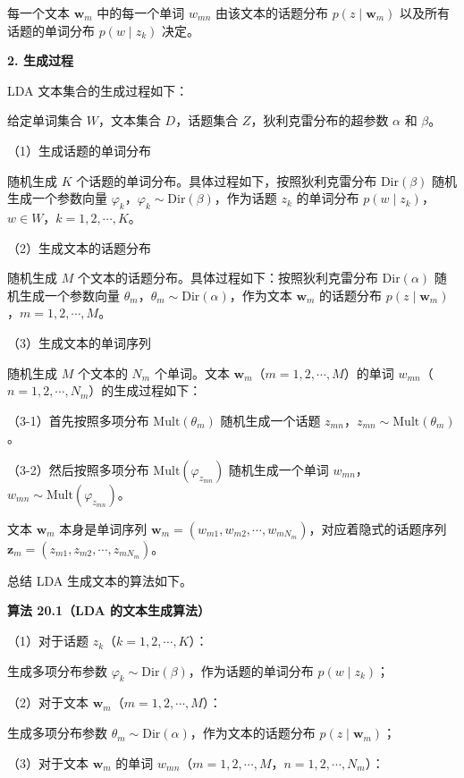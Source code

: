 \documentclass[UTF8,12pt,a4paper,fontset=fandol]{ctexart}
\begin{document}
每一个文本 $\mathbf{w}_m$ 中的每一个单词 $w_{mn}$ 由该文本的话题分布 $p(z\mid \mathbf{w}_m)$ 以及所有话题的单词分布 $p(w\mid z_k)$ 决定。

\noindent\textbf{2. 生成过程}

LDA 文本集合的生成过程如下：

给定单词集合 $W$，文本集合 $D$，话题集合 $Z$，狄利克雷分布的超参数 $\alpha$ 和 $\beta$。

（1）生成话题的单词分布

随机生成 $K$ 个话题的单词分布。具体过程如下，按照狄利克雷分布 $\mathrm{Dir}(\beta)$ 随机生成一个参数向量 $\varphi_k$，$\varphi_k\sim \mathrm{Dir}(\beta)$，作为话题 $z_k$ 的单词分布 $p(w\mid z_k)$，$w\in W$，$k=1,2,\cdots,K$。

（2）生成文本的话题分布

随机生成 $M$ 个文本的话题分布。具体过程如下：按照狄利克雷分布 $\mathrm{Dir}(\alpha)$ 随机生成一个参数向量 $\theta_m$，$\theta_m\sim \mathrm{Dir}(\alpha)$，作为文本 $\mathbf{w}_m$ 的话题分布 $p(z\mid \mathbf{w}_m)$，$m=1,2,\cdots,M$。

（3）生成文本的单词序列

随机生成 $M$ 个文本的 $N_m$ 个单词。文本 $\mathbf{w}_m$（$m=1,2,\cdots,M$）的单词 $w_{mn}$（$n=1,2,\cdots,N_m$）的生成过程如下：

（3-1）首先按照多项分布 $\mathrm{Mult}(\theta_m)$ 随机生成一个话题 $z_{mn}$，$z_{mn}\sim \mathrm{Mult}(\theta_m)$。

（3-2）然后按照多项分布 $\mathrm{Mult}(\varphi_{z_{mn}})$ 随机生成一个单词 $w_{mn}$，$w_{mn}\sim \mathrm{Mult}(\varphi_{z_{mn}})$。

文本 $\mathbf{w}_m$ 本身是单词序列 $\mathbf{w}_m=(w_{m1},w_{m2},\cdots,w_{mN_m})$，对应着隐式的话题序列 $\mathbf{z}_m=(z_{m1},z_{m2},\cdots,z_{mN_m})$。

总结 LDA 生成文本的算法如下。

\noindent\textbf{算法 20.1（LDA 的文本生成算法）}

（1）对于话题 $z_k$（$k=1,2,\cdots,K$）：

生成多项分布参数 $\varphi_k\sim \mathrm{Dir}(\beta)$，作为话题的单词分布 $p(w\mid z_k)$；

（2）对于文本 $\mathbf{w}_m$（$m=1,2,\cdots,M$）：

生成多项分布参数 $\theta_m\sim \mathrm{Dir}(\alpha)$，作为文本的话题分布 $p(z\mid \mathbf{w}_m)$；

（3）对于文本 $\mathbf{w}_m$ 的单词 $w_{mn}$（$m=1,2,\cdots,M$，$n=1,2,\cdots,N_m$）：
\end{document}
